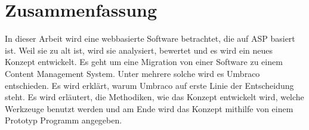 \chapter*{Zusammenfassung}
In dieser Arbeit wird eine webbasierte Software betrachtet, die auf ASP basiert ist. Weil sie zu alt ist, wird sie analysiert, bewertet und es wird ein neues Konzept entwickelt. Es geht um eine Migration von einer Software zu einem Content Management System. Unter mehrere solche wird es Umbraco entschieden. Es wird erklärt, warum Umbraco auf erste Linie der Entscheidung steht. Es wird erläutert, die Methodiken, wie das Konzept entwickelt wird, welche Werkzeuge benutzt werden und am Ende wird das Konzept mithilfe von einem Prototyp Programm angegeben. 
